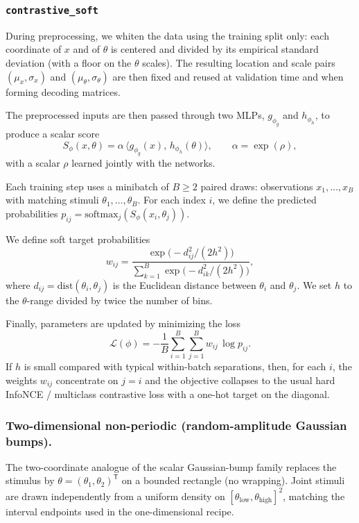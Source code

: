\subsubsection{\texttt{contrastive\_soft}}

During preprocessing, we whiten the data using the training split only: each coordinate of $x$ and of $\theta$ is centered and divided by its empirical standard deviation (with a floor on the $\theta$ scales). The resulting location and scale pairs $(\mu_x,\sigma_x)$ and $(\mu_\theta,\sigma_\theta)$ are then fixed and reused at validation time and when forming decoding matrices.

The preprocessed inputs are then passed through two MLPs, $g_{\phi_g}$ and $h_{\phi_h}$, to produce a scalar score 
\[
S_\phi(x,\theta)=\alpha\,\big\langle g_{\phi_g}(x),\,h_{\phi_h}(\theta)\big\rangle,\qquad \alpha=\exp(\rho),
\]
with a scalar $\rho$ learned jointly with the networks.

Each training step uses a minibatch of $B\ge 2$ paired draws: observations $x_1,\ldots,x_B$ with matching stimuli $\theta_1,\ldots,\theta_B$. For each index $i$, we define the predicted probabilities $p_{ij}=\mathrm{softmax}_j(S_\phi(x_i,\theta_j))$.

We define soft target probabilities
\[
w_{ij}=\frac{\exp\big(-d_{ij}^2/(2h^2)\big)}{\sum_{k=1}^B \exp\big(-d_{ik}^2/(2h^2)\big)},
\]
where $d_{ij}=\mathrm{dist}(\theta_i,\theta_j)$ is the Euclidean distance between $\theta_i$ and $\theta_j$.
We set $h$ to the $\theta$-range divided by twice the number of bins.

Finally, parameters are updated by minimizing the loss
\[
\mathcal{L}(\phi)=-\frac{1}{B}\sum_{i=1}^B\sum_{j=1}^B w_{ij}\,\log p_{ij}.
\]
If $h$ is small compared with typical within-batch separations, then, for each $i$, the weights $w_{ij}$ concentrate on $j=i$ and the objective collapses to the usual hard InfoNCE / multiclass contrastive loss with a one-hot target on the diagonal.

\subsubsection{Two-dimensional non-periodic (random-amplitude Gaussian bumps).}
The two-coordinate analogue of the scalar Gaussian-bump family replaces the stimulus by $\theta=(\theta_1,\theta_2)^{\mathsf{T}}$ on a bounded rectangle (no wrapping).
Joint stimuli are drawn independently from a uniform density on $[\theta_{\mathrm{low}},\theta_{\mathrm{high}}]^2$, matching the interval endpoints used in the one-dimensional recipe.

